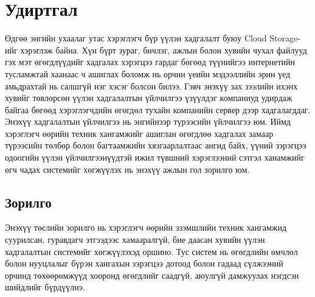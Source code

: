 
{}
\label{Introduction} %
    \section*{Удиртгал}
        Өдгөө энгийн ухаалаг утас хэрэглэгч бүр үүлэн хадгалалт буюу Cloud Storage-ийг хэрэглэж байна. Хүн бүрт зураг, бичлэг, ажлын болон хувийн чухал файлууд гэх мэт өгөгдлүүдийг хадгалах хэрэгцээ гардаг бөгөөд түүнийгээ интернетийн тусламжтай хаанаас ч  ашиглах боломж нь орчин үеийн мэдээллийн эрин үед амьдрахтай нь салшгүй нэг хэсэг болсон билээ. Гэвч энэхүү зах зээлийн ихэнх хувийг төвлөрсөн үүлэн хадгалалтын үйлчилгээ үзүүлдэг компаниуд удирдаж байгаа бөгөөд хэрэглэгчдийн өгөгдөл тухайн компанийн сервер дээр хадгалагддаг. Энэхүү хадгалалтын үйлчилгээ нь энгийнээр түрээсийн үйлчилгээ юм. Иймд хэрэглэгч өөрийн техник хангамжийг ашиглан өгөгдлөө хадгалах замаар түрээсийн төлбөр болон багтаамжийн хязгаарлалтаас ангид байх, үүний зэрэгцээ одоогийн үүлэн үйлчилгээнүүдтэй ижил түвшний хэрэглээний сэтгэл ханамжийг өгч чадах системийг хөгжүүлэх нь энэхүү ажлын гол зорилго юм. 
    \subsection*{Зорилго}
    Энэхүү төслийн зорилго нь хэрэглэгч өөрийн эзэмшлийн техник хангамжид суурилсан, гуравдагч этгээдээс хамааралгүй, бие даасан хувийн үүлэн хадгалалтын системийг хөгжүүлэхэд оршино. Тус систем нь өгөгдлийн өмчлөл болон нууцлалыг бүрэн хангахын зэрэгцээ дотоод болон гадаад сүлжээний орчинд төхөөрөмжүүд хооронд өгөгдлийг саадгүй, аюулгүй дамжуулах нэгдсэн шийдлийг бүрдүүлнэ.
    
